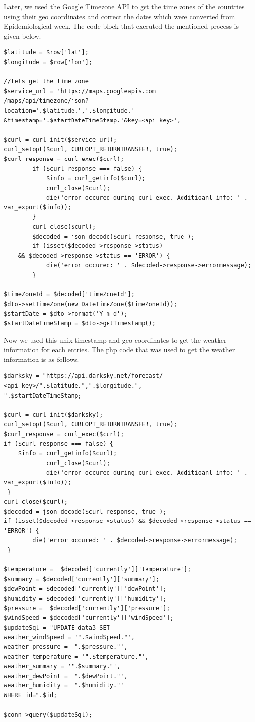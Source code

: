 \documentclass[conference]{IEEEtran}
\begin{document}
Later, we used the Google Timezone API to get the time zones of the countries using their geo coordinates and correct the dates which were converted from Epidemiological week. The code block that executed the mentioned process is given below.

\begin{lstlisting}
$latitude = $row['lat']; 
$longitude = $row['lon'];

//lets get the time zone
$service_url = 'https://maps.googleapis.com
/maps/api/timezone/json?
location='.$latitude.','.$longitude.'
&timestamp='.$startDateTimeStamp.'&key=<api key>';

$curl = curl_init($service_url);
curl_setopt($curl, CURLOPT_RETURNTRANSFER, true);
$curl_response = curl_exec($curl);
        if ($curl_response === false) {
            $info = curl_getinfo($curl);
            curl_close($curl);
            die('error occured during curl exec. Additioanl info: ' . var_export($info));
        }
        curl_close($curl);
        $decoded = json_decode($curl_response, true );
        if (isset($decoded->response->status) 
	&& $decoded->response->status == 'ERROR') {
            die('error occured: ' . $decoded->response->errormessage);
        }
         
$timeZoneId = $decoded['timeZoneId'];
$dto->setTimeZone(new DateTimeZone($timeZoneId));
$startDate = $dto->format('Y-m-d');
$startDateTimeStamp = $dto->getTimestamp();

\end{lstlisting}

Now we used this unix timestamp and geo coordinates to get the weather information for each entries. The php code that was used to get the weather information is as follows.

\begin{lstlisting}
$darksky = "https://api.darksky.net/forecast/
<api key>/".$latitude.",".$longitude.",
".$startDateTimeStamp;

$curl = curl_init($darksky);
curl_setopt($curl, CURLOPT_RETURNTRANSFER, true);
$curl_response = curl_exec($curl);
if ($curl_response === false) {
	$info = curl_getinfo($curl);
            curl_close($curl);
            die('error occured during curl exec. Additioanl info: ' . var_export($info));
 }
curl_close($curl);
$decoded = json_decode($curl_response, true );
if (isset($decoded->response->status) && $decoded->response->status == 'ERROR') {
        die('error occured: ' . $decoded->response->errormessage);
 }
         
$temperature =  $decoded['currently']['temperature'];
$summary = $decoded['currently']['summary'];
$dewPoint = $decoded['currently']['dewPoint'];
$humidity = $decoded['currently']['humidity'];
$pressure =  $decoded['currently']['pressure'];
$windSpeed = $decoded['currently']['windSpeed'];
$updateSql = "UPDATE data3 SET 
weather_windSpeed = '".$windSpeed."', 
weather_pressure = '".$pressure."', 
weather_temperature = '".$temperature."', 
weather_summary = '".$summary."', 
weather_dewPoint = '".$dewPoint."', 
weather_humidity = '".$humidity."' 
WHERE id=".$id;

$conn->query($updateSql);

\end{lstlisting}
\end{document}
